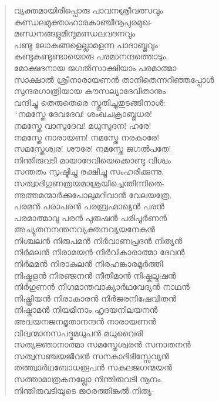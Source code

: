\begin{verse}
വ്യക്തമായിരിപ്പൊരു പാവനശ്രീവത്സവും\\
കുണ്ഡലമുക്താഹാരകാഞ്ചീനൂപുരമുഖ-\\
മണ്ഡനങ്ങളുമിന്ദുമണ്ഡലവദനവും\\
പണ്ടു ലോകങ്ങളെല്ലാമളന്ന പാദാബ്ജവും\\
കണ്ടുകണ്ടുണ്ടായൊരു പരമാനന്ദത്തൊടും\\
മോക്ഷദനായ ജഗല്‍സാക്ഷിയാം പരമാത്മാ\\
സാക്ഷാല്‍ ശ്രീനാരായണന്‍ താനിതെന്നറിഞ്ഞപ്പോള്‍\\
സുന്ദരഗാത്രിയായ കൗസല്യാദേവിതാനും\\
വന്ദിച്ചു തെരുതെരെ സ്തുതിച്ചുതുടങ്ങിനാള്‍:\\
“നമസ്തേ ദേവദേവ! ശംഖചക്രാബ്ജധര!\\
നമസ്തേ വാസുദേവ! മധുസൂദന! ഹരേ!\\
നമസ്തേ നാരായണ! നമസ്തേ നരകാരേ!\\
സമസ്തേശ്വര! ശൗരേ! നമസ്തേ ജഗല്‍പതേ!\\
നിന്തിരുവടി മായാദേവിയെക്കൊണ്ടു വിശ്വം\\
സന്തതം സൃഷ്ടിച്ചു രക്ഷിച്ചു സംഹരിക്കുന്നു.\\
സത്വാദിഗുണത്രയമാശ്രയിച്ചെന്തിന്നിതെ-\\
ന്നുത്തമന്മാര്‍ക്കുപോലുമറിവാന്‍ വേലയത്രേ.\\
പരമന്‍ പരാപരന്‍ പരബ്രഹ്മാഖ്യന്‍ പരന്‍\\
പരമാത്മാവു പരന്‍ പുരുഷന്‍ പരിപൂര്‍ണന്‍\\
അച്യുതനനന്തനവ്യക്തനവ്യയനേകന്‍\\
നിശ്ചലന്‍ നിരുപമന്‍ നിര്‍വാണപ്രദന്‍ നിത്യന്‍\\
നിര്‍മലന്‍ നിരാമയന്‍ നിര്‍വികാരാത്മാ ദേവന്‍\\
നിര്‍മമന്‍ നിരാകുലന്‍ നിരഹങ്കാരമൂര്‍ത്തി\\
നിഷ്കളന്‍ നിരഞ്ജനന്‍ നീതിമാന്‍ നിഷ്കല്മഷന്‍\\
നിര്‍ഗുണന്‍ നിഗമാന്തവാക്യാര്‍ഥവേദ്യന്‍ നാഥന്‍\\
നിഷ്ക്രിയന്‍ നിരാകാരന്‍ നിര്‍ജരനിഷേവിതന്‍\\
നിഷ്കാമന്‍ നിയമിനാം ഹൃദയനിലയനന്‍\\
അദ്വയനജനമൃതാനന്ദന്‍ നാരായണന്‍\\
വിദ്വന്മാനസപദ്മമധുപന്‍ മധുവൈരി\\
സത്യജ്ഞാനാത്മാ സമസ്തേശ്വരന്‍ സനാതനന്‍\\
സത്വസഞ്ചയജീവന്‍ സനകാദിഭിസ്സേവ്യന്‍\\
തത്ത്വാര്‍ഥബോധരൂപന്‍ സകലജഗന്മയന്‍\\
സത്താമാത്രകനല്ലോ നിന്തിരുവടി നൂനം.\\
നിന്തിരുവടിയുടെ ജഠരത്തിങ്കല്‍ നിത്യ-\\

\end{verse}
